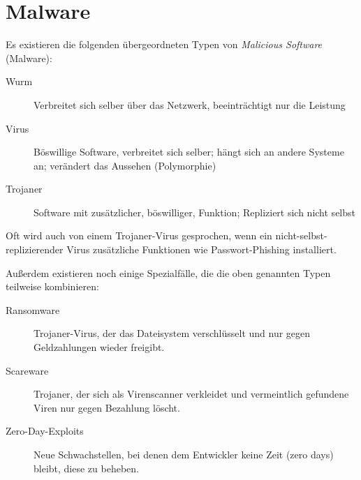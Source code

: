 \documentclass[a4paper, 11pt, accentcolor = tud3b]{tudreport}
\begin{document}
        \section{Malware}
            Es existieren die folgenden übergeordneten Typen von \textit{Malicious Software} (Malware):
            \begin{description}
            	\item[Wurm] Verbreitet sich selber über das Netzwerk, beeinträchtigt nur die Leistung
            	\item[Virus] Böswillige Software, verbreitet sich selber; hängt sich an andere Systeme an; verändert das Aussehen (Polymorphie)
            	\item[Trojaner] Software mit zusätzlicher, böswilliger, Funktion; Repliziert sich nicht selbst
            \end{description}
	        Oft wird auch von einem Trojaner-Virus gesprochen, wenn ein nicht-selbst-replizierender Virus zusätzliche Funktionen wie Passwort-Phishing installiert.
	        
	        Außerdem existieren noch einige Spezialfälle, die die oben genannten Typen teilweise kombinieren:
	        \begin{description}
	        	\item[Ransomware] Trojaner-Virus, der das Dateisystem verschlüsselt und nur gegen Geldzahlungen wieder freigibt.
	        	\item[Scareware] Trojaner, der sich als Virenscanner verkleidet und vermeintlich gefundene Viren nur gegen Bezahlung löscht.
	        	\item[Zero-Day-Exploits] Neue Schwachstellen, bei denen dem Entwickler keine Zeit (zero days) bleibt, diese zu beheben.
	        \end{description}
\end{document}
